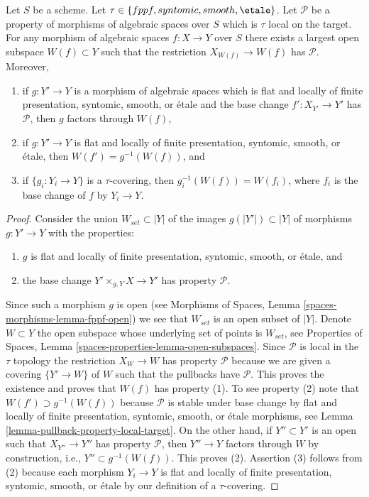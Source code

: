 \begin{lemma}
\label{lemma-largest-open-of-the-base}
Let $S$ be a scheme.
Let $\tau \in \{fppf, syntomic, smooth, \etale\}$.
Let $\mathcal{P}$ be a property of morphisms of algebraic spaces over $S$
which is $\tau$ local on the target. For any morphism of algebraic spaces
$f : X \to Y$ over $S$ there exists a largest open subspace
$W(f) \subset Y$ such that the restriction $X_{W(f)} \to W(f)$ has
$\mathcal{P}$. Moreover,
\begin{enumerate}
\item if $g : Y' \to Y$ is a morphism of algebraic spaces which is
flat and locally of finite presentation, syntomic, smooth, or \'etale
and the base change $f' : X_{Y'} \to Y'$ has $\mathcal{P}$, then
$g$ factors through $W(f)$,
\item if $g : Y' \to Y$ is flat and locally of finite presentation,
syntomic, smooth, or \'etale, then $W(f') = g^{-1}(W(f))$, and
\item if $\{g_i : Y_i \to Y\}$ is a $\tau$-covering, then
$g_i^{-1}(W(f)) = W(f_i)$, where $f_i$ is the base change of $f$
by $Y_i \to Y$.
\end{enumerate}
\end{lemma}

\begin{proof}
Consider the union $W_{set} \subset |Y|$ of the images
$g(|Y'|) \subset |Y|$ of morphisms $g : Y' \to Y$ with the properties:
\begin{enumerate}
\item $g$ is flat and locally of finite presentation, syntomic,
smooth, or \'etale, and
\item the base change $Y' \times_{g, Y} X \to Y'$ has property
$\mathcal{P}$.
\end{enumerate}
Since such a morphism $g$ is open (see
Morphisms of Spaces, Lemma \ref{spaces-morphisms-lemma-fppf-open})
we see that $W_{set}$ is an open subset of $|Y|$. Denote $W \subset Y$
the open subspace whose underlying set of points is $W_{set}$, see
Properties of Spaces, Lemma \ref{spaces-properties-lemma-open-subspaces}.
Since $\mathcal{P}$ is local in the $\tau$ topology the restriction
$X_W \to W$ has property $\mathcal{P}$ because we are given a covering
$\{Y' \to W\}$ of $W$ such that the pullbacks have $\mathcal{P}$.
This proves the existence and proves that $W(f)$ has property (1).
To see property (2) note that $W(f') \supset g^{-1}(W(f))$ because
$\mathcal{P}$ is stable under base change by flat and locally of finite
presentation, syntomic, smooth, or \'etale morphisms, see
Lemma \ref{lemma-pullback-property-local-target}.
On the other hand, if $Y'' \subset Y'$ is an open such that
$X_{Y''} \to Y''$ has property $\mathcal{P}$, then $Y'' \to Y$ factors
through $W$ by construction, i.e., $Y'' \subset g^{-1}(W(f))$. This
proves (2). Assertion (3) follows from (2) because each morphism
$Y_i \to Y$ is flat and locally of finite presentation, syntomic,
smooth, or \'etale by our definition of a $\tau$-covering.
\end{proof}


